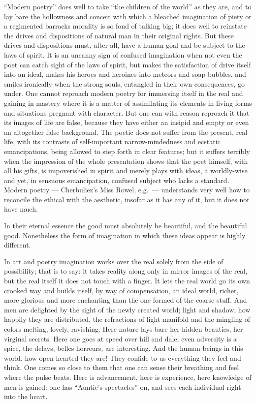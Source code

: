 \documentclass[12pt,a4paper,openany]{book}
\newcommand{\opage}[1]{\marginnote{\footnotesize\textit{[#1]}}}
\begin{document}
``Modern poetry'' does well to take ``the children of the world'' as they are, and to lay bare the hollowness and conceit
\setcounter{footnote}{0}%
\opage{88}with which a bleached imagination of piety or a regimented barracks morality is so fond of talking big; it does well to reinstate the drives and dispositions of natural man in their original rights. But these drives and dispositions must, after all, have a human goal and be subject to the laws of spirit. It is an uncanny sign of confused imagination when not even the poet can catch sight of the laws of spirit, but makes the satisfaction of drive itself into an ideal, makes his heroes and heroines into meteors and soap bubbles, and smiles ironically when the strong souls, entangled in their own consequences, go under. One cannot reproach modern poetry for immersing itself in the real and gaining in mastery where it is a matter of assimilating its elements in living forms and situations pregnant with character. But one can with reason reproach it that its images of life are false, because they have either an insipid and empty or even an altogether false background. The poetic does not suffer from the present, real life, with its contrasts of self-important narrow-mindedness and ecstatic emancipations, being allowed to step forth in clear features; but it suffers terribly when the impression of the whole presentation shows that the poet himself, with all his gifts, is impoverished in spirit and merely plays with ideas, a worldly-wise and yet, in sensuous emancipation, confused subject who lacks a standard. Modern poetry --- Cherbuliez's Miss Rowel, e.g.\ --- understands very well how to reconcile the ethical with the aesthetic, insofar as it has any of it, but it does not have much. %

In their eternal essence the good must absolutely be beautiful, and the beautiful good. Nonetheless the
\setcounter{footnote}{0}%
\opage{89}form of imagination in which these ideas appear is highly different.

In art and poetry imagination works over the real solely from the side of possibility; that is to say: it takes reality along only in mirror images of the real, but the real itself it does not touch with a finger. It lets the real world go its own crooked way and builds itself, by way of compensation, an ideal world, richer, more glorious and more enchanting than the one formed of the coarse stuff. And men are delighted by the sight of the newly created world; light and shadow, how happily they are distributed, the refractions of light manifold and the mingling of colors melting, lovely, ravishing. Here nature lays bare her hidden beauties, her virginal secrets. Here one goes at speed over hill and dale; even adversity is a spice, the delays, belles horreurs, are interesting. And the human beings in this world, how open-hearted they are! They confide to us everything they feel and think. One comes so close to them that one can sense their breathing and feel where the pulse beats. Here is advancement, here is experience, here knowledge of men is gained: one has ``Auntie's spectacles'' on, and sees each individual right into the heart.
\end{document}
